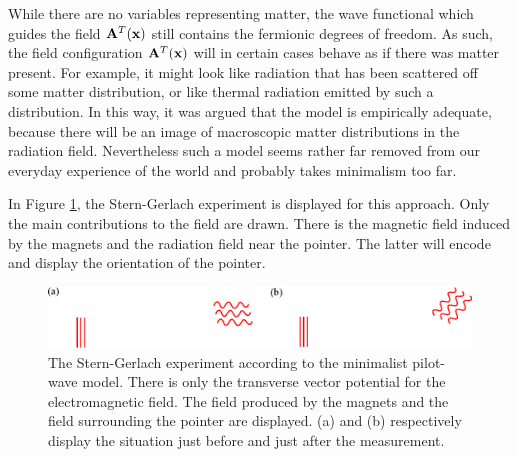 \documentclass[12pt]{article}
\begin{document}
While there are no variables representing matter, the wave functional which guides the field ${\bf A}^T({\bf x})$ still contains the fermionic degrees of freedom. As such, the field configuration ${\bf A}^T({\bf x})$ will in certain cases behave as if there was matter present. For example, it might look like radiation that has been scattered off some matter distribution, or like thermal radiation emitted by such a distribution. In this way, it was argued that the model is empirically adequate, because there will be an image of macroscopic matter distributions in the radiation field. Nevertheless such a model seems rather far removed from our everyday experience of the world and probably takes minimalism too far.

In Figure \ref{minimalist}, the Stern-Gerlach experiment is displayed for this approach. Only the main contributions to the field are drawn. There is the magnetic field induced by the magnets and the radiation field near the pointer. The latter will encode and display the orientation of the pointer.

\begin{figure}
\begin{center}
\includegraphics[width=\textwidth]{minimalist.eps}
\end{center}
\caption{\label{minimalist}The Stern-Gerlach experiment according to the minimalist pilot-wave model. There is only the transverse vector potential for the electromagnetic field. The field produced by the magnets and the field surrounding the pointer are displayed. (a) and (b) respectively display the situation just before and just after the measurement.}
\end{figure}
\end{document}
